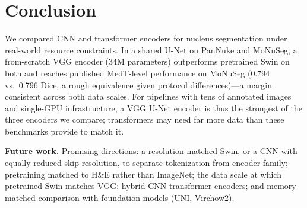 \documentclass[runningheads]{llncs}
\begin{document}
\section{Conclusion}

We compared CNN and transformer encoders for nucleus segmentation under real-world resource constraints. In a shared U-Net on PanNuke and MoNuSeg, a from-scratch VGG encoder (34M parameters) outperforms pretrained Swin on both and reaches published MedT-level performance on MoNuSeg (0.794 vs.\ 0.796 Dice, a rough equivalence given protocol differences)---a margin consistent across both data scales. For pipelines with tens of annotated images and single-GPU infrastructure, a VGG U-Net encoder is thus the strongest of the three encoders we compare; transformers may need far more data than these benchmarks provide to match it.

\noindent\textbf{Future work.} Promising directions: a resolution-matched Swin, or a CNN with equally reduced skip resolution, to separate tokenization from encoder family; pretraining matched to H\&E rather than ImageNet; the data scale at which pretrained Swin matches VGG; hybrid CNN-transformer encoders; and memory-matched comparison with foundation models (UNI, Virchow2).
\end{document}

